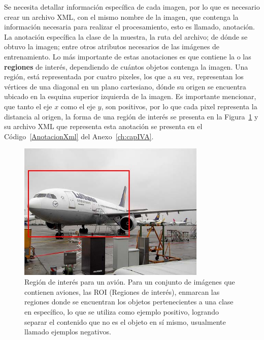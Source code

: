 Se necesita detallar información específica de cada imagen, por lo que es necesario crear un archivo XML, con el mismo nombre de la imagen, que contenga la información necesaria para realizar el procesamiento, esto es llamado, anotación. La anotación específica la clase de la muestra, la ruta del archivo; de dónde se obtuvo la imagen; entre otros atributos necesarios de las imágenes de entrenamiento. Lo más importante de estas anotaciones es que contiene la o las \textbf{regiones} de interés, dependiendo de cuántos objetos contenga la imagen. Una región, está representada por cuatro pixeles, los que a su vez, representan los vértices de una diagonal en un plano cartesiano, dónde su origen se encuentra ubicado en la esquina superior izquierda de la imagen. Es importante mencionar, que tanto el eje $x$ como el eje $y$, son positivos, por lo que cada pixel representa la distancia al origen, la forma de una región de interés se presenta en la Figura~\ref{fig:anota} y su archivo XML que representa esta anotación se presenta en el Código~\ref{AnotacionXml} del Anexo~\ref{ch:capIVA}.

\begin{figure}[tb]
 \centering
  \includegraphics[width=0.8\textwidth]{Figuras/plain.jpg}
  \caption[Región de interés]{Región de interés para un avión. Para un conjunto de imágenes que contienen aviones, las ROI (Regiones de interés), enmarcan las regiones donde se encuentran los objetos pertenecientes a una clase en específico, lo que se utiliza como ejemplo positivo, logrando separar el contenido que no es el objeto en sí mismo, usualmente llamado ejemplos negativos.}
  \label{fig:anota}
\end{figure}

